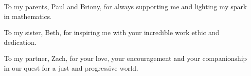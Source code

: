 \thispagestyle{empty}
\begin{dedication}
 To my parents, Paul and Briony, for always supporting me and lighting my spark in mathematics.
 
 To my sister, Beth, for inspiring me with your incredible work ethic and dedication.
 
To my partner, Zach, for your love, your encouragement and your companionship in our quest for a just and progressive world.
\end{dedication}